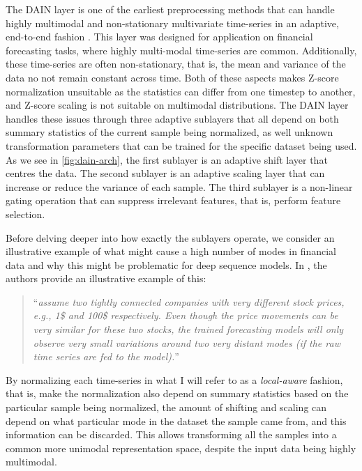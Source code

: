 \documentclass{statsmsc}
\begin{document}
{The \ac{DAIN} layer is one of the earliest preprocessing methods that can
handle highly multimodal and non-stationary multivariate time-series in an adaptive,
end-to-end fashion \cite{dain}.
This layer was designed for application on financial forecasting tasks, where highly multi-modal
time-series are common. Additionally, these time-series are often non-stationary, that is, the
mean and variance of the data no not remain constant across time.
Both of these aspects makes Z-score normalization unsuitable as the statistics can differ
from one timestep to another, and Z-score scaling is not suitable on multimodal distributions.
The \ac{DAIN} layer handles these issues through three adaptive sublayers that all depend
on both summary statistics of the current sample being normalized, as well unknown transformation
parameters that can be trained for the specific dataset being used.
As we see in \cref{fig:dain-arch}, the first sublayer is an adaptive shift layer
that centres the data. The second sublayer is an adaptive scaling layer that can increase or
reduce the variance of each sample. The third sublayer is a non-linear gating operation
that can suppress irrelevant features, that is, perform feature selection.

Before delving deeper into how exactly the sublayers operate, we consider an illustrative
example of what might cause a high number of modes in financial data and why this might
be problematic for deep sequence models. In
\cite{dain}, the authors provide an illustrative example of this:
\begin{quote}
    ``\textit{assume two tightly
    connected companies with very different stock prices, e.g., 1\$
    and 100\$ respectively. Even though the price movements can
    be very similar for these two stocks, the trained forecasting
    models will only observe very small variations around two
    very distant modes (if the raw time series are fed to the model).}''
\end{quote}
By normalizing each time-series in what I will refer to as a
\textit{local-aware} fashion, that is, make the normalization also depend on summary statistics
based on the particular sample being normalized,
the amount of shifting and scaling can depend on what particular mode in the dataset the sample
came from, and this information can be discarded. This allows transforming all the samples into
a common more unimodal representation space, despite the input data being highly multimodal.

}
\end{document}
